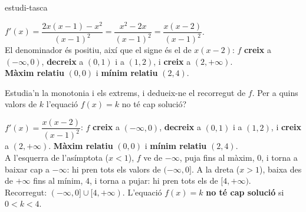 \begin{apartats}
\begin{tria}{estudi-tasca}
\begin{solucio}
$f'(x)=\dfrac{2x(x-1)-x^2}{(x-1)^2}=\dfrac{x^2-2x}{(x-1)^2}=\dfrac{x(x-2)}{(x-1)^2}$.\\
El denominador és positiu, així que el signe és el de $x(x-2)$: $f$ \textbf{creix} a
$(-\infty,0)$, \textbf{decreix} a $(0,1)$ i a $(1,2)$, i \textbf{creix} a $(2,+\infty)$.\\
\textbf{Màxim relatiu} $(0,0)$ i \textbf{mínim relatiu} $(2,4)$.
\begin{center}
\end{center}
\end{solucio}

Estudia'n la monotonia i els extrems, i dedueix-ne el recorregut de $f$. Per a quins valors de $k$
l'equació $f(x)=k$ no té cap solució?

\begin{solucio}
$f'(x)=\dfrac{x(x-2)}{(x-1)^2}$: $f$ \textbf{creix} a $(-\infty,0)$, \textbf{decreix} a $(0,1)$ i a
$(1,2)$, i \textbf{creix} a $(2,+\infty)$. \textbf{Màxim relatiu} $(0,0)$ i \textbf{mínim relatiu}
$(2,4)$.\\
A l'esquerra de l'asímptota ($x<1$), $f$ ve de $-\infty$, puja fins al màxim, $0$, i torna a baixar
cap a $-\infty$: hi pren tots els valors de $(-\infty,0]$. A la dreta ($x>1$), baixa des de $+\infty$
fins al mínim, $4$, i torna a pujar: hi pren tots els de $[4,+\infty)$.\\
Recorregut: $(-\infty,0]\cup[4,+\infty)$. L'equació $f(x)=k$ \textbf{no té cap solució} si $0<k<4$.
\end{solucio}
\end{tria}

\end{apartats}
